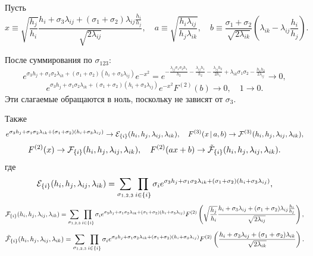 \documentclass[12pt]{article}
\def\FV{F^{(2)}}
\def\FW{F^{(3)}}
\def\cFW{{\cal F}^{(3)}}
\begin{document}
Пусть
\begin{equation}
    x \equiv \sqrt{\frac{h_j}{h_i}}\frac{h_i + \sigma_3\lambda_{ij} + (\sigma_1+\sigma_2)\lambda_{ij}\frac{h_i}{h_j}}{\sqrt{2\lambda_{ij}}}, \quad a \equiv \sqrt{\frac{h_i\lambda_{ij}}{h_j\lambda_{ik}}}, \quad b \equiv \frac{\sigma_1+\sigma_2}{\sqrt{2\lambda_{ik}}}\left(\lambda_{ik}-\lambda_{ij}\frac{h_i}{h_j}\right).
\end{equation}

После суммирования по $\sigma_{123}$:
\begin{equation}
    e^{\sigma_3h_j+\sigma_1\sigma_2\lambda_{ik}+(\sigma_1+\sigma_2)(h_i + \sigma_3\lambda_{ij})}e^{-x^2} = e^{- \frac{\lambda_{ij} \sigma_{1} \sigma_{2} h_{1}}{h_{2}} - \frac{\lambda_{ij} h_{1}}{h_{2}} - \frac{\lambda_{ij} h_{2}}{2 h_{1}} + \lambda_{ik} \sigma_{1} \sigma_{2} - \frac{h_{1} h_{2}}{2 \lambda_{ij}}} \rightarrow 0,
\end{equation}
\begin{equation}
    e^{\sigma_3h_j+\sigma_1\sigma_2\lambda_{ik}+(\sigma_1+\sigma_2)(h_i + \sigma_3\lambda_{ij})}e^{-x^2}\FV(b) \rightarrow 0, \quad 1 \rightarrow 0.
\end{equation}
Эти слагаемые обращаются в ноль, поскольку не зависят от $\sigma_3$. 

Также
\begin{equation}
    e^{\sigma_3h_j+\sigma_1\sigma_2\lambda_{ik}+(\sigma_1+\sigma_2)(h_i + \sigma_3\lambda_{ij})} \rightarrow {\cal E}_{\{i\}}(h_i, h_j, \lambda_{ij}, \lambda_{ik}), \quad
    \FW(x \, | \, a, b) \rightarrow \cFW(h_i, h_j, \lambda_{ij}, \lambda_{ik}),
\end{equation}
\begin{equation}
    \FV(x) \rightarrow {\cal F}_{\{i\}}(h_i, h_j, \lambda_{ij}, \lambda_{ik}), \quad \FV(ax+b) \rightarrow \tilde{\cal F}_{\{i\}}(h_i, h_j, \lambda_{ij}, \lambda_{ik}).
\end{equation}
где
\begin{equation}
    {\cal E}_{\{i\}}(h_i, h_j, \lambda_{ij}, \lambda_{ik}) = \sum\limits_{\sigma_{1,2,3}}\prod\limits_{i\in\{i\}} \sigma_i e^{\sigma_3h_j+\sigma_1\sigma_2\lambda_{ik}+(\sigma_1+\sigma_2)(h_i + \sigma_3\lambda_{ij})},
 \end{equation}
\begin{equation}
    {\cal F}_{\{i\}}(h_i, h_j, \lambda_{ij}, \lambda_{ik}) = \sum\limits_{\sigma_{1,2,3}}\prod\limits_{i\in\{i\}} \sigma_i e^{\sigma_3h_j+\sigma_1\sigma_2\lambda_{ik}+(\sigma_1+\sigma_2)(h_i + \sigma_3\lambda_{ij})} \FV\left(\sqrt{\frac{h_j}{h_i}}\frac{h_i + \sigma_3\lambda_{ij} + (\sigma_1+\sigma_2)\lambda_{ij}\frac{h_i}{h_j}}{\sqrt{2\lambda_{ij}}}\right),
\end{equation}
\begin{equation}
    \tilde{\cal F}_{\{i\}}(h_i, h_j, \lambda_{ij}, \lambda_{ik}) = \sum\limits_{\sigma_{1,2,3}} \prod\limits_{i\in\{i\}} \sigma_i e^{\sigma_3h_j+\sigma_1\sigma_2\lambda_{ik}+(\sigma_1+\sigma_2)(h_i + \sigma_3\lambda_{ij})}\FV\left(\frac{h_i + \sigma_3\lambda_{ij}+(\sigma_1+\sigma_2)\lambda_{ik}}{\sqrt{2\lambda_{ik}}}\right).
\end{equation}
\end{document}
